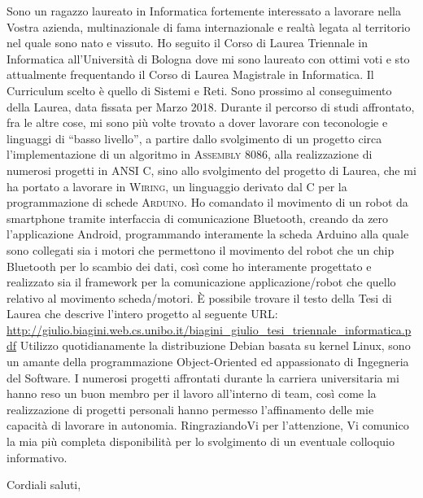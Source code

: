 Sono un ragazzo laureato in Informatica fortemente interessato a lavorare nella
Vostra azienda, multinazionale di fama internazionale e realtà legata al
territorio nel quale sono nato e vissuto.\newline
\newline
Ho seguito il Corso di Laurea Triennale in Informatica all'Università di Bologna
dove mi sono laureato con ottimi voti e sto attualmente frequentando il Corso di
Laurea Magistrale in Informatica. Il Curriculum scelto è quello di Sistemi e
Reti. Sono prossimo al conseguimento della Laurea, data fissata per Marzo
2018.\newline
\newline
Durante il percorso di studi affrontato, fra le altre cose, mi sono più volte
trovato a dover lavorare con teconologie e linguaggi di ``basso livello'', a
partire dallo svolgimento di un progetto circa l'implementazione di un algoritmo
in \textsc{Assembly 8086}, alla realizzazione di numerosi progetti in
\textsc{ANSI C}, sino allo svolgimento del progetto di Laurea, che mi ha portato
a lavorare in \textsc{Wiring}, un linguaggio derivato dal \textsc{C} per la
programmazione di schede \textsc{Arduino}.\newline
\newline
Ho comandato il movimento di un robot da smartphone tramite interfaccia di
comunicazione Bluetooth, creando da zero l'applicazione Android, programmando
interamente la scheda Arduino alla quale sono collegati sia i motori che
permettono il movimento del robot che un chip Bluetooth per lo scambio dei dati,
così come ho interamente progettato e realizzato sia il framework per la
comunicazione applicazione/robot che quello relativo al movimento
scheda/motori.\newline
\newline
È possibile trovare il testo della Tesi di Laurea che descrive l'intero progetto
al seguente URL:\newline
\small{\url{http://giulio.biagini.web.cs.unibo.it/biagini_giulio_tesi_triennale_informatica.pdf}}\newline
\newline
Utilizzo quotidianamente la distribuzione Debian basata su kernel Linux, sono un
amante della programmazione Object-Oriented ed appassionato di Ingegneria del
Software. I numerosi progetti affrontati durante la carriera universitaria mi
hanno reso un buon membro per il lavoro all'interno di team, così come la
realizzazione di progetti personali hanno permesso l'affinamento delle mie
capacità di lavorare in autonomia.\newline
\newline
RingraziandoVi per l'attenzione, Vi comunico la mia più completa disponibilità
per lo svolgimento di un eventuale colloquio informativo.

\closing{Cordiali saluti,}


\makeletterclosing

\newpage
